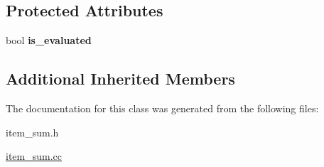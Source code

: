 \subsection*{Protected Attributes}
\begin{DoxyCompactItemize}
\item 
\mbox{\label{classItem__sum__num_ab79831c6d4711b47efc8ae32e283ce33}} 
bool {\bfseries is\+\_\+evaluated}
\end{DoxyCompactItemize}
\subsection*{Additional Inherited Members}


The documentation for this class was generated from the following files\+:\begin{DoxyCompactItemize}
\item 
item\+\_\+sum.\+h\item 
\mbox{\hyperlink{item__sum_8cc}{item\+\_\+sum.\+cc}}\end{DoxyCompactItemize}
